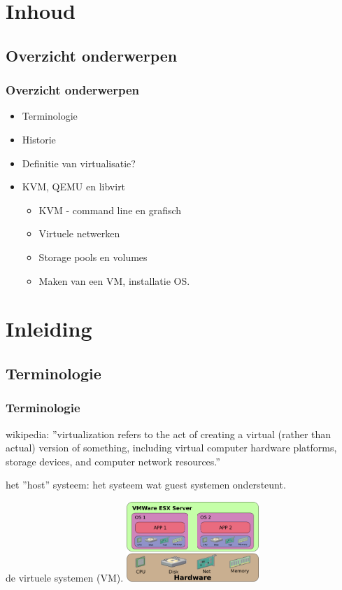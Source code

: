 \section{Inhoud}
\subsection{Overzicht onderwerpen}
\begin{styleframe}
	\frametitle{Overzicht onderwerpen}
\begin{itemize}
\item Terminologie
\item Historie
\item Definitie van virtualisatie?
\item KVM, QEMU en libvirt
\begin{itemize}
	\item KVM - command line en grafisch
	\item Virtuele netwerken
	\item Storage pools en volumes
	\item Maken van een VM, installatie OS.
\end{itemize}
\end{itemize}
\end{styleframe}

\section{Inleiding}
\subsection{Terminologie}
\begin{styleframe}
    \frametitle{Terminologie}
\begin{description}[blaat]
	\item[virtualisatie] wikipedia: ''virtualization refers to the act of creating a virtual (rather than actual) version of something, including virtual computer hardware platforms, storage devices, and computer network resources.''
	\pause
	\item[host] het ''host'' systeem: het systeem wat guest systemen ondersteunt.
	\pause
	\item[guest] de virtuele systemen (VM).
	\pause
	\includegraphics[width=5cm]{img/VMware-schema.png}\\
\end{description}
\end{styleframe}

